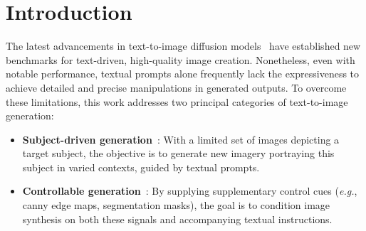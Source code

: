 \begin{abstract}
Large-scale text-to-image diffusion models have demonstrated remarkable abilities in producing photorealistic visuals from textual descriptions. Effectively steering these powerful models for diverse downstream applications, however, remains a key open question. In response, we propose Orthogonal Finetuning~(OFT), a systematic finetuning strategy designed to adapt text-to-image diffusion models for specific downstream scenarios. Distinct from prevailing approaches, OFT can rigorously maintain the hyperspherical energy, which reflects the relational structure among neurons constrained to the unit hypersphere. Our analysis indicates that conserving this energy is fundamental for sustaining the models' semantic generation capabilities. To enhance stability during finetuning, we further introduce Constrained Orthogonal Finetuning (COFT), which applies an explicit constraint to control the radius of the hypersphere. In particular, we examine two representative finetuning challenges: subject-driven generation, aiming to synthesize novel images of a specific entity given a handful of reference images and a text prompt, and controllable generation, where the objective is to incorporate auxiliary control signals. Our empirical evaluations demonstrate that the OFT framework surpasses current techniques both in terms of generation fidelity and training efficiency.
\end{abstract}

\section{Introduction}

The latest advancements in text-to-image diffusion models~\cite{saharia2022photorealistic,ramesh2022hierarchical,rombach2022high} have established new benchmarks for text-driven, high-quality image creation. Nonetheless, even with notable performance, textual prompts alone frequently lack the expressiveness to achieve detailed and precise manipulations in generated outputs. To overcome these limitations, this work addresses two principal categories of text-to-image generation:

\begin{itemize}[leftmargin=*,nosep]

    \item \textbf{Subject-driven generation}~\cite{ruiz2023dreambooth}: With a limited set of images depicting a target subject, the objective is to generate new imagery portraying this subject in varied contexts, guided by textual prompts.
    \item \textbf{Controllable generation}~\cite{zhang2023adding,mou2023t2i}: By supplying supplementary control cues (\emph{e.g.}, canny edge maps, segmentation masks), the goal is to condition image synthesis on both these signals and accompanying textual instructions.
\end{itemize}

